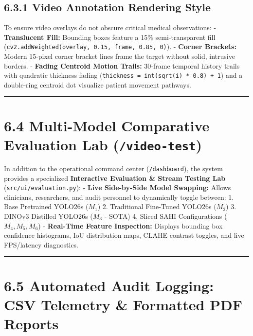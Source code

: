 \subsection{6.3.1 Video Annotation Rendering
Style}\label{video-annotation-rendering-style}

To ensure video overlays do not obscure critical medical observations: -
\textbf{Translucent Fill:} Bounding boxes feature a 15\%
semi-transparent fill
(\texttt{cv2.addWeighted(overlay,\ 0.15,\ frame,\ 0.85,\ 0)}). -
\textbf{Corner Brackets:} Modern 15-pixel corner bracket lines frame the
target without solid, intrusive borders. - \textbf{Fading Centroid
Motion Trails:} 30-frame temporal history trails with quadratic
thickness fading (\texttt{thickness\ =\ int(sqrt(i)\ *\ 0.8)\ +\ 1}) and
a double-ring centroid dot visualize patient movement pathways.

\begin{center}\rule{0.5\linewidth}{0.5pt}\end{center}

\section{\texorpdfstring{6.4 Multi-Model Comparative Evaluation Lab
(\texttt{/video-test})}{6.4 Multi-Model Comparative Evaluation Lab (/video-test)}}\label{multi-model-comparative-evaluation-lab-video-test}

In addition to the operational command center (\texttt{/dashboard}), the
system provides a specialized \textbf{Interactive Evaluation \& Stream
Testing Lab} (\texttt{src/ui/evaluation.py}): - \textbf{Live
Side-by-Side Model Swapping:} Allows clinicians, researchers, and audit
personnel to dynamically toggle between: 1. Base Pretrained YOLO26s
(\(M_1\)) 2. Traditional Fine-Tuned YOLO26s (\(M_2\)) 3. DINOv3
Distilled YOLO26s (\(M_3\) - SOTA) 4. Sliced SAHI Configurations
(\(M_4, M_5, M_6\)) - \textbf{Real-Time Feature Inspection:} Displays
bounding box confidence histograms, IoU distribution maps, CLAHE
contrast toggles, and live FPS/latency diagnostics.

\begin{center}\rule{0.5\linewidth}{0.5pt}\end{center}

\section{6.5 Automated Audit Logging: CSV Telemetry \& Formatted PDF
Reports}\label{automated-audit-logging-csv-telemetry-formatted-pdf-reports}

